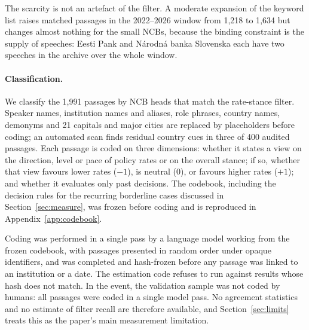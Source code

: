 \documentclass[11pt]{article}
\theoremstyle{plain}
\begin{document}
The scarcity is not an artefact of the filter. A moderate expansion of the keyword list raises matched passages in the 2022--2026 window from 1{,}218 to 1{,}634 but changes almost nothing for the small NCBs, because the binding constraint is the supply of speeches: Eesti Pank and N\'arodn\'a banka Slovenska each have two speeches in the archive over the whole window.

\paragraph{Classification.}
We classify the 1{,}991 passages by NCB heads that match the rate-stance filter. Speaker names, institution names and aliases, role phrases, country names, demonyms and 21 capitals and major cities are replaced by placeholders before coding; an automated scan finds residual country cues in three of 400 audited passages. Each passage is coded on three dimensions: whether it states a view on the direction, level or pace of policy rates or on the overall stance; if so, whether that view favours lower rates ($-1$), is neutral ($0$), or favours higher rates ($+1$); and whether it evaluates only past decisions. The codebook, including the decision rules for the recurring borderline cases discussed in Section~\ref{sec:measure}, was frozen before coding and is reproduced in Appendix~\ref{app:codebook}.

Coding was performed in a single pass by a language model working from the frozen codebook, with passages presented in random order under opaque identifiers, and was completed and hash-frozen before any passage was linked to an institution or a date. The estimation code refuses to run against results whose hash does not match. In the event, the validation sample was not coded by humans: all passages were coded in a single model pass. No agreement statistics and no estimate of filter recall are therefore available, and Section~\ref{sec:limits} treats this as the paper's main measurement limitation.
\end{document}
